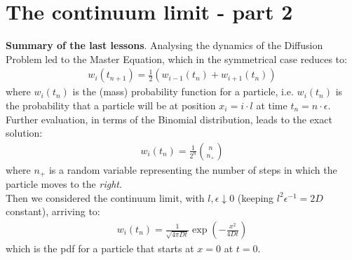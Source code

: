 \documentclass[../template.tex]{subfiles}
\begin{document}
\section{The continuum limit - part 2}

\textbf{Summary of the last lessons}.
Analysing the dynamics of the Diffusion Problem led to the Master Equation, which in the symmetrical case reduces to:
\begin{align}
    w_i(t_{n+1}) = \frac{1}{2}(w_{i-1}(t_n) + w_{i+1}(t_n)) 
    \label{eqn:master_equation}
\end{align}
where $w_i(t_n)$ is the (mass) probability function for a particle, i.e. $w_i(t_n)$ is the probability that a particle will be at position $x_i = i\cdot l$ at time $t_n = n \cdot \epsilon$.\\
Further evaluation, in terms of the Binomial distribution, leads to the exact solution:
\begin{align}
    w_i(t_n) = \frac{1}{2^n} {n\choose n_+} 
    \label{eqn:discrete_sol}
\end{align}
where $n_+$ is a random variable representing the number of steps in which the particle moves to the \textit{right}.\\
Then we considered the continuum limit, with $l, \epsilon \downarrow 0$ (keeping $l^2 \epsilon^{-1} = 2D$ constant), arriving to:
\begin{align*}
    w_i(t_n) = \frac{1}{\sqrt{4 \pi D t}} \exp\left(-\frac{x^2}{4 D t} \right) 
\end{align*} 
which is the pdf for a particle that starts at $x=0$ at $t=0$.\\  
\end{document}
